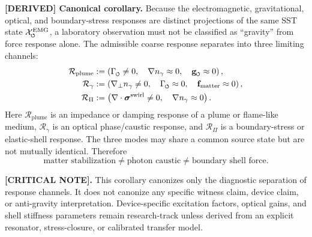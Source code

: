 \documentclass[11pt]{article}
\theoremstyle{definition}
\theoremstyle{plain}
\theoremstyle{remark}
\newcommand{\swirlarrow}{\mathchoice{\mkern-2mu\scriptstyle\boldsymbol{\circlearrowleft}}{\mkern-2mu\scriptstyle\boldsymbol{\circlearrowleft}}{\mkern-2mu\scriptscriptstyle\boldsymbol{\circlearrowleft}}{\mkern-2mu\scriptscriptstyle\boldsymbol{\circlearrowleft}}}
\begin{document}
        \textbf{[DERIVED] Canonical corollary.}
        Because the electromagnetic, gravitational, optical, and boundary-stress
        responses are distinct projections of the same SST state
        \(\mathcal{X}^{\mathrm{EMG}}_{\swirlarrow}\), a laboratory observation must not be
        classified as ``gravity'' from force response alone. The admissible coarse
        response separates into three limiting channels:
        \begin{align}
            \mathcal{R}_{\mathrm{plume}}
            &:=
            \left(
            \Gamma_{\swirlarrow}\neq 0,
            \quad
            \nabla n_\gamma \approx 0,
            \quad
            \mathbf{g}_{\swirlarrow}\approx 0
            \right),
            \label{eq:triadic_plume_mode}\\
            \mathcal{R}_{\gamma}
            &:=
            \left(
            \nabla_\perp n_\gamma \neq 0,
            \quad
            \Gamma_{\swirlarrow}\approx 0,
            \quad
            \mathbf{f}_{\mathrm{matter}}\approx 0
            \right),
            \label{eq:triadic_photon_mode}\\
            \mathcal{R}_{\Pi}
            &:=
            \left(
            \nabla\cdot\boldsymbol{\sigma}^{\mathrm{swirl}}\neq0,
            \quad
            \nabla n_\gamma\approx0
            \right).
            \label{eq:triadic_boundary_mode}
        \end{align}
        Here \(\mathcal{R}_{\mathrm{plume}}\) is an impedance or damping response of a
        plume or flame-like medium, \(\mathcal{R}_{\gamma}\) is an optical phase/caustic
        response, and \(\mathcal{R}_{\Pi}\) is a boundary-stress or elastic-shell response.
        The three modes may share a common source state but are not mutually identical.
        Therefore
        \begin{equation}
        \boxed{
        \text{matter stabilization}
        \neq
        \text{photon caustic}
        \neq
        \text{boundary shell force}.
        }
        \end{equation}

        \textbf{[CRITICAL NOTE].}
        This corollary canonizes only the diagnostic separation of response channels.
        It does not canonize any specific witness claim, device claim, or anti-gravity
        interpretation. Device-specific excitation factors, optical gains, and shell
        stiffness parameters remain research-track unless derived from an explicit
        resonator, stress-closure, or calibrated transfer model.
\end{document}
